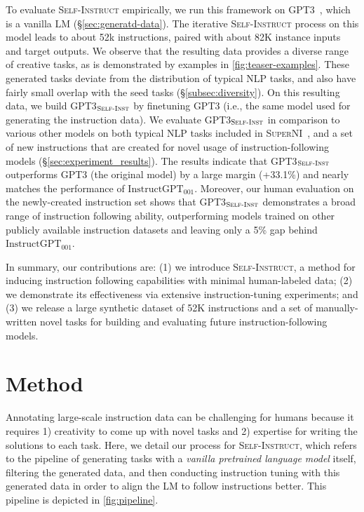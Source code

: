 \documentclass[11pt]{article}
\newcommand{\name}{\textsc{Self-Instruct}}
\newcommand{\supernatShort}{\textsc{SuperNI}}
\newcommand{\gptthree}{\textsc{GPT3}}
\newcommand{\gptself}{\textsc{GPT3}$_{\textsc{Self-Inst}}$}
\newcommand{\gptinstruct}[1]{$\text{InstructGPT}_{\text{#1}}$}
\begin{document}
To evaluate \name{} empirically, we run this framework on \gptthree{}~\cite{brown2020gpt3}, which is a vanilla LM (\S\ref{sec:generatd-data}).
The iterative \name{} process on this model leads to about 52k instructions, paired with about 82K instance inputs and target outputs. 
We observe that the resulting data provides a diverse range of creative tasks, as is demonstrated by examples in \autoref{fig:teaser-examples}. These generated tasks deviate from the distribution of typical NLP tasks, and also have fairly small overlap with the seed tasks (\S\ref{subsec:diversity}).
On this resulting data, we build \gptself{} by finetuning \gptthree{} (i.e., the same model used for generating the instruction data). 
We evaluate \gptself{} in comparison to various other models on both typical NLP tasks included in \supernatShort{}~\cite{wang2022benchmarking}, and a set of new instructions that are created for novel usage of instruction-following models (\S\ref{sec:experiment_results}). 
The results indicate that 
\gptself{} outperforms \gptthree{} (the original model) by a large margin (+33.1\%) and nearly matches the performance of \gptinstruct{001}. Moreover, our human evaluation on the newly-created instruction set shows that \gptself{} demonstrates a broad range of instruction following ability, outperforming models trained on other publicly available instruction datasets and leaving only a 5\% gap behind \gptinstruct{001}. 

In summary, our contributions are: (1) we introduce \name{}, a method for inducing instruction following capabilities with minimal human-labeled data; (2) we demonstrate its effectiveness via extensive instruction-tuning experiments; and (3) we release a large synthetic dataset of 52K instructions and a set of manually-written novel tasks for building and evaluating future instruction-following models.

\section{Method}
\label{sec:method}

Annotating large-scale instruction data can be challenging for humans because it requires 1) creativity to come up with novel tasks and 2) 
expertise for writing the solutions to each task. 
Here, we detail our process for \name, which refers to the pipeline of generating tasks with a \textit{vanilla pretrained language model} itself, filtering the generated data, and then 
conducting 
instruction tuning with this generated data in order to align the LM to follow instructions better. This pipeline is depicted in \autoref{fig:pipeline}. 
\end{document}
